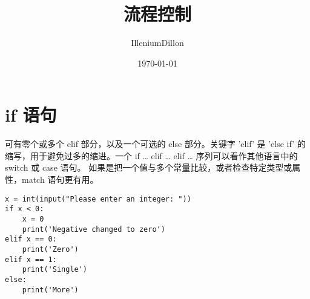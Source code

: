 \documentclass[a4paper, 12pt]{article}
\begin{document}
\title{流程控制}
\author{IlleniumDillon}
\date{\today}
\maketitle

\section{if 语句}
可有零个或多个 elif 部分，以及一个可选的 else 部分。关键字 'elif' 是 'else if' 的缩写，用于避免过多的缩进。一个 if … elif … elif … 序列可以看作其他语言中的 switch 或 case 语句。
如果是把一个值与多个常量比较，或者检查特定类型或属性，match 语句更有用。\par
\begin{listing}[h!]
\begin{verbatim}
x = int(input("Please enter an integer: "))
if x < 0:
    x = 0
    print('Negative changed to zero')
elif x == 0:
    print('Zero')
elif x == 1:
    print('Single')
else:
    print('More')
\end{verbatim}
\end{listing}
\end{document}
